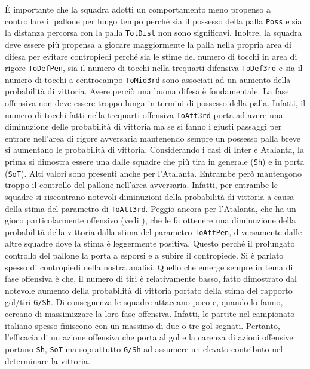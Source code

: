 È importante che la squadra adotti un comportamento meno propenso a controllare il pallone per lungo tempo perché sia il possesso della palla \texttt{Poss} e sia la distanza percorsa con la palla \texttt{TotDist} non sono significavi. Inoltre, la squadra deve essere più propensa a giocare maggiormente la palla nella propria area di difesa per evitare contropiedi perché sia le stime del numero di tocchi in area di rigore \texttt{ToDefPen}, sia il numero di tocchi nella trequarti difensiva \texttt{ToDef3rd} e sia il numero di tocchi a centrocampo \texttt{ToMid3rd} sono associati ad un aumento della probabilità di vittoria. Avere perciò una buona difesa è fondamentale. La fase offensiva non deve essere troppo lunga in termini di possesso della palla. Infatti, il numero di tocchi fatti nella trequarti offensiva \texttt{ToAtt3rd} porta ad avere una diminuzione delle probabilità di vittoria ma se si fanno i giusti passaggi per entrare nell'area di rigore avversaria mantenendo sempre un possesso palla breve si aumentano le probabilità di vittoria. Considerando i casi di Inter e Atalanta, %
la prima si dimostra essere una dalle squadre che più tira in generale (\texttt{Sh}) e in porta (\texttt{SoT}). Alti valori sono presenti anche per l'Atalanta. Entrambe però mantengono troppo il controllo del pallone nell'area avversaria. Infatti, per entrambe le squadre si riscontrano notevoli diminuzioni della probabilità di vittoria a causa della stima del parametro di \texttt{ToAtt3rd}. Peggio ancora per l'Atalanta, che ha un gioco particolarmente offensivo (vedi \textit{\cite{ataGioco}}), che le fa ottenere una diminuzione della probabilità della vittoria dalla stima del parametro \texttt{ToAttPen}, diversamente dalle altre squadre dove la stima è leggermente positiva. Questo perché il prolungato controllo del pallone la porta a esporsi e a subire il contropiede. Si è parlato spesso di contropiedi nella nostra analisi. Quello che emerge sempre in tema di fase offensiva è che, il numero di tiri è relativamente basso, fatto dimostrato dal notevole aumento della probabilità di vittoria portato della stima del rapporto gol/tiri \texttt{G/Sh}. Di conseguenza le squadre attaccano poco e, quando lo fanno, cercano di massimizzare la loro fase offensiva. Infatti, le partite nel campionato italiano spesso finiscono con un massimo di due o tre gol segnati. Pertanto, l'efficacia di un azione offensiva che porta al gol e la carenza di azioni offensive portano \texttt{Sh}, \texttt{SoT} ma soprattutto \texttt{G/Sh} ad assumere un elevato contributo nel determinare la vittoria.\\
